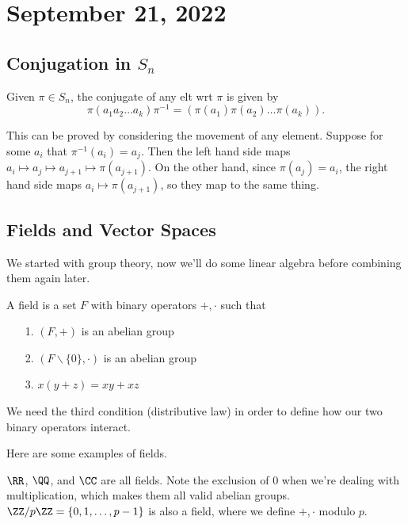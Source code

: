 \section{September 21, 2022}

\subsection{Conjugation in $S_n$}

Given $\pi\in S_n$, the conjugate of any elt wrt $\pi$ is given by 
\[\pi (a_1 a_2 \hdots a_k)\pi^{-1} = (\pi(a_1) \pi(a_2) \hdots \pi(a_k)).\]

This can be proved by considering the movement of any element. Suppose for some $a_i$ that $\pi^{-1}(a_i) = a_j$. Then the left hand side maps $a_i\mapsto a_j\mapsto a_{j+1}\mapsto \pi(a_{j+1})$. On the other hand, since $\pi(a_j)=a_i$, the right hand side maps $a_i\mapsto \pi(a_{j+1})$, so they map to the same thing. 

\subsection{Fields and Vector Spaces}

We started with group theory, now we'll do some linear algebra before combining them again later. 

\begin{definition}

A \ac{field} is a set $F$ with binary operators $+, \cdot$ such that 
\begin{enumerate}
    \item [1.] $(F, +)$ is an abelian group
    \item [2.] $(F\backslash\{0\}, \cdot)$ is an abelian group
    \item [3.] $x(y+z) = xy+xz$
\end{enumerate}
\end{definition}

We need the third condition (distributive law) in order to define how our two binary operators interact. 

\begin{example}
\exlabel

Here are some examples of fields. 
\end{example}

$\RR$, $\QQ$, and $\CC$ are all fields. Note the exclusion of $0$ when we're dealing with multiplication, which makes them all valid abelian groups. $\ZZ/p\ZZ = \{0, 1, \hdots, p-1\}$ is also a field, where we define $+,\cdot$ modulo $p$. 

